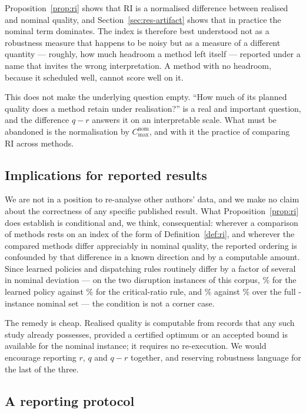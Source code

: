 \documentclass[a4paper,fleqn]{cas-sc}
\newcommand{\Cmax}{C_{\max}}
\newcommand{\RI}{\mathrm{RI}}
\begin{document}
Proposition~\ref{prop:ri} shows that $\RI$ is a normalised difference between
realised and nominal quality, and Section~\ref{sec:res-artifact} shows that in
practice the nominal term dominates. The index is therefore best understood not
as a robustness measure that happens to be noisy but as a measure of a different
quantity --- roughly, how much headroom a method left itself --- reported under
a name that invites the wrong interpretation. A method with no headroom, because
it scheduled well, cannot score well on it.

This does not make the underlying question empty. ``How much of its planned
quality does a method retain under realisation?'' is a real and important
question, and the difference $q-r$ answers it on an interpretable scale.
What must be abandoned is the normalisation by $\Cmax^{\text{nom}}$, and with
it the practice of comparing $\RI$ across methods.

\subsection{Implications for reported results}

We are not in a position to re-analyse other authors' data, and we make no claim
about the correctness of any specific published result. What
Proposition~\ref{prop:ri} does establish is conditional and, we think,
consequential: wherever a comparison of methods rests on an index of the form of
Definition~\ref{def:ri}, and wherever the compared methods differ appreciably in
nominal quality, the reported ordering is confounded by that difference in a
known direction and by a computable amount. Since learned policies and
dispatching rules routinely differ by a factor of several in nominal deviation
--- on the two disruption instances of this corpus, \NomRlTwo{}\% for the
learned policy against \NomCrTwo{}\% for the critical-ratio rule, and
\NomRlAll{}\% against \NomCrAll{}\% over the full \NInstances{}-instance
nominal set --- the condition is not a corner case.

The remedy is cheap. Realised quality is computable from records that any such
study already possesses, provided a certified optimum or an accepted bound is
available for the nominal instance; it requires no re-execution. We would
encourage reporting $r$, $q$ and $q-r$ together, and reserving robustness
language for the last of the three.

\subsection{A reporting protocol}
\end{document}
